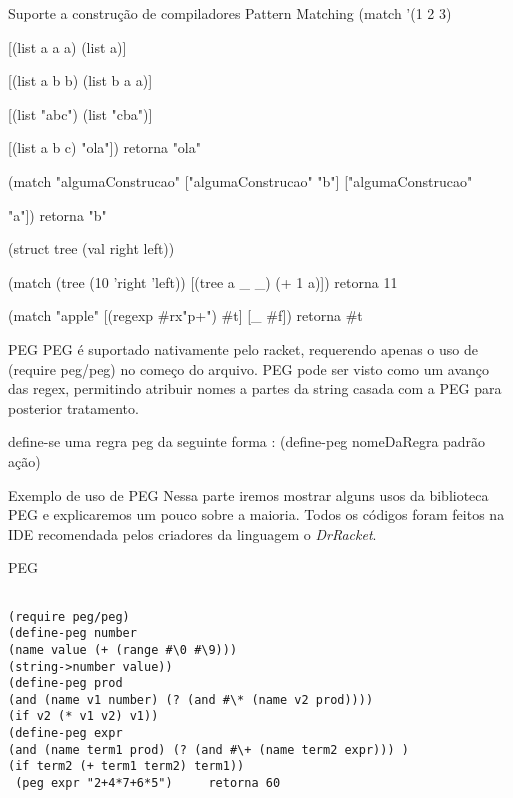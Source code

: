 \documentclass{beamer}
\begin{document}
\begin{frame}[fragile]{Suporte a construção de compiladores}
Pattern Matching
(match '(1 2 3)
 
      [(list a a a) (list a)]
      
      [(list a b b) (list b a a)]
      
      [(list "abc") (list "cba")]
      
      [(list a b c) "ola"]) retorna "ola"
      
 (match "algumaConstrucao" ["algumaConstrucao" "b"] ["algumaConstrucao" 
 
 "a"]) retorna "b"
 
 (struct tree (val right left))
 
 (match (tree (10 'right 'left)) [(tree a \_ \_) (+ 1 a)]) retorna 11
 
 (match "apple" [(regexp \#rx"p+") \#t] [\_ \#f])  retorna \#t
\end{frame}


\begin{frame}{PEG}
PEG é suportado nativamente pelo racket, requerendo apenas o uso de (require peg/peg) no começo do arquivo.
PEG pode ser visto como um avanço das regex, permitindo atribuir nomes a partes da string casada com a PEG
para posterior tratamento.

define-se uma regra peg da seguinte forma :
(define-peg nomeDaRegra padrão ação)

\end{frame}


\begin{frame}{Exemplo de uso de PEG}
Nessa parte iremos mostrar alguns usos da biblioteca PEG e explicaremos um pouco sobre a maioria.
Todos os códigos foram feitos na IDE recomendada pelos criadores da linguagem o \textit{DrRacket}.
\end{frame}





\begin{frame}[fragile]{PEG}
\begin{verbatim}

(require peg/peg)
(define-peg number
(name value (+ (range #\0 #\9)))
(string->number value))
(define-peg prod
(and (name v1 number) (? (and #\* (name v2 prod))))
(if v2 (* v1 v2) v1))
(define-peg expr
(and (name term1 prod) (? (and #\+ (name term2 expr))) )
(if term2 (+ term1 term2) term1))
 (peg expr "2+4*7+6*5")     retorna 60
\end{verbatim}
\end{frame}
\end{document}
